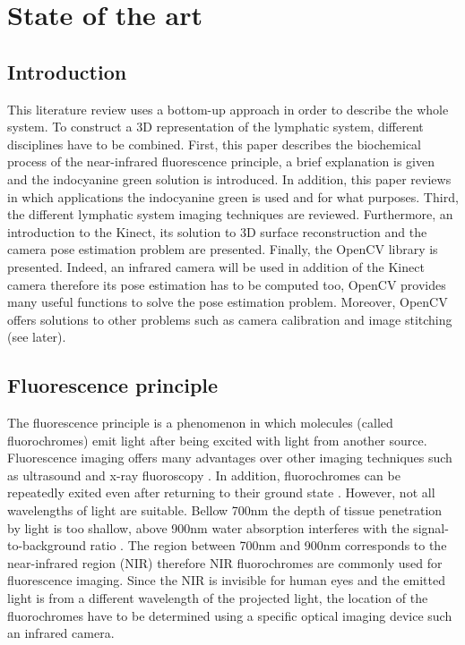 \chapter[State of the art]{State of the art}
\section{Introduction}
This literature review uses a bottom-up approach in order to describe the whole system. To construct a 3D representation of the lymphatic system, different disciplines have to be combined. First, this paper describes the biochemical process of the near-infrared fluorescence principle, a brief explanation is given and the indocyanine green solution is introduced. In addition, this paper reviews in which applications the indocyanine green is used and for what purposes. Third, the different lymphatic system imaging techniques are reviewed. Furthermore, an introduction to the Kinect, its solution to 3D surface reconstruction and the camera pose estimation problem are presented. Finally, the OpenCV library is presented. Indeed, an infrared camera will be used in addition of the Kinect camera therefore its pose estimation has to be computed too, OpenCV provides many useful functions to solve the pose estimation problem. Moreover, OpenCV offers solutions to other problems such as camera calibration and image stitching (see later).

\section{Fluorescence principle}
\label{sec:fluorescence principle}
The fluorescence principle is a phenomenon in which molecules (called fluorochromes) emit light after being excited with light from another source. Fluorescence imaging offers many advantages over other imaging techniques such as ultrasound and x-ray fluoroscopy \cite{troyan_flare_2009}. In addition, fluorochromes can be repeatedly exited even after returning to their ground state \cite{marshall_near-infrared_2010}. However, not all wavelengths of light are suitable. Bellow 700nm the depth of tissue penetration by light is too shallow, above 900nm water absorption interferes with the signal-to-background ratio \cite{kovar_systematic_2007}. The region between 700nm and 900nm corresponds to the near-infrared region (NIR) therefore NIR fluorochromes are commonly used for fluorescence imaging. 
Since the NIR is invisible for human eyes and the emitted light is from a different wavelength of the projected light, the location of the fluorochromes have to be determined using a specific optical imaging device such an infrared camera.\\

